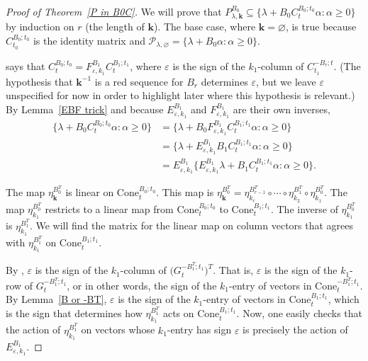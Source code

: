 \documentclass{amsart}
\theoremstyle{definition}
\theoremstyle{remark}
\numberwithin{equation}{section}
\newcommand{\ep}{\varepsilon}
\newcommand{\set}[1]{{\lbrace #1 \rbrace}}
\renewcommand{\th}{^\text{th}}
\newcommand{\0}{{\mathbf{0}}}
\newcommand{\Cone}{\mathrm{Cone}}
\newcommand{\kk}{{\boldsymbol{k}}}
\renewcommand{\P}{\mathcal{P}}
\renewcommand{\th}{^\text{th}}
\begin{document}
\begin{proof}[Proof of Theorem~\ref{P in B0C}]
We will prove that $P^{B_0}_{\lambda,\kk}\subseteq\set{\lambda+B_0C_t^{B_0;t_0}\alpha:\alpha\ge0}$ by induction on $r$ (the length of $\kk$).
The base case, where $\kk=\varnothing$, is true because $C_{t_0}^{B_0;t_0}$ is the identity matrix and $\P_{\lambda,\varnothing}=\set{\lambda+B_0\alpha:\alpha\ge0}$.
 
\cite[Proposition~1.4]{NZ} says that $C_t^{B_0;t_0}=F^{B_1}_{\ep,k_1}C_t^{B_1;t_1}$, where $\ep$ is the sign of the $k_1$-column of $C_{t_1}^{-B_r;t}$.  
(The hypothesis that $\kk^{-1}$ is a red sequence for $B_r$ determines $\ep$, but we leave $\ep$ unspecified for now in order to highlight later where this hypothesis is relevant.)
By Lemma~\ref{EBF trick} and because $E^{B_1}_{\ep,k_1}$ and $F^{B_1}_{\ep,k_1}$ are their own inverses,
\begin{equation}\label{ind B0C}\begin{aligned}
\set{\lambda+B_0C_t^{B_0;t_0}\alpha:\alpha\ge0}
&=\set{\lambda+B_0F^{B_1}_{\ep,k_1}C_t^{B_1;t_1}\alpha:\alpha\ge0}\\
&=\set{\lambda+E^{B_1}_{\ep,k_1}B_1C_t^{B_1;t_1}\alpha:\alpha\ge0}\\
&=E^{B_1}_{\ep,k_1}\set{E^{B_1}_{\ep,k_1}\lambda+B_1C_t^{B_1;t_1}\alpha:\alpha\ge0}.
\end{aligned}\end{equation}

The map $\eta_{\kk}^{B_0^T}$ is linear on $\Cone_t^{B_0;t_0}$.  
This map is $\eta_{\kk}^{B_0^T}={\eta_{k_r}^{B_{r-1}^T}\circ\cdots\circ\eta_{k_2}^{B_1^T}\circ\eta_{k_1}^{B_0^T}}$.
The map $\eta_{k_1}^{B_0^T}$ restricts to a linear map from $\Cone_t^{B_0;t_0}$ to $\Cone_t^{B_1;t_1}$.
The inverse of $\eta_{k_1}^{B_0^T}$ is $\eta_{k_1}^{B_1^T}$.
We will find the matrix for the linear map on column vectors that agrees with $\eta_{k_1}^{B_1^T}$ on $\Cone_t^{B_1;t_1}$.

By \cite[(1.13)]{NZ}, $\ep$ is the sign of the $k_1$-column of $\bigl(G_t^{-B_1^T;t_1}\bigr)^T$.
That is, $\ep$ is the sign of the $k_1$-row of $G_t^{-B_1^T;t_1}$, or in other words, the sign of the $k_1$-entry of vectors in $\Cone_t^{-B^T_1;t_1}$.
By Lemma~\ref{B or -BT}, $\ep$ is the sign of the $k_1$-entry of vectors in $\Cone_t^{B_1;t_1}$, which is the sign that determines how $\eta_{k_1}^{B_1^T}$ acts on $\Cone_t^{B_1;t_1}$.
Now, one easily checks that the action of $\eta_{k_1}^{B_1^T}$ on vectors whose $k_1$-entry has sign $\ep$ is precisely the action of $E^{B_1}_{\ep,k_1}$.


\end{proof}
\end{document}
